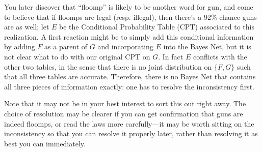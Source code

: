 \documentclass{article}
\newcommand\changed[1]{{\color{note-fg} #1}}
\begin{document}
\begin{example}
		You later discover that ``floomp'' is likely to be another word for gun, and come to believe that if floomps are legal (resp. illegal), then there's a 92\% chance guns are as well; let $E$ be the Conditional Probability Table (CPT) associated to this realization.
		A first reaction might be to simply add this conditional information by adding $F$ as a parent of $G$ and incorporating $E$ into the Bayes Net, \changed{but it is not clear what to do with our original CPT on $G$}.
		\changed{In fact} $E$ conflicts with the other two tables, in the sense that there is no joint distribution on $\{F, G\}$ such that all three tables are accurate. 
		Therefore, there is no Bayes Net that contains all three pieces of information exactly: one has to resolve the inconsistency first.
			\changed{}
			
			
		Note that it may not be in your best interest to sort this out right away. The choice of resolution may be clearer if you can get confirmation that guns are indeed floomps, or read the laws more carefully---it may be worth sitting on the inconsistency so that you can resolve it properly later, rather than resolving it as best you can immediately.

%			
%			
%
		

\end{example}
\end{document}
